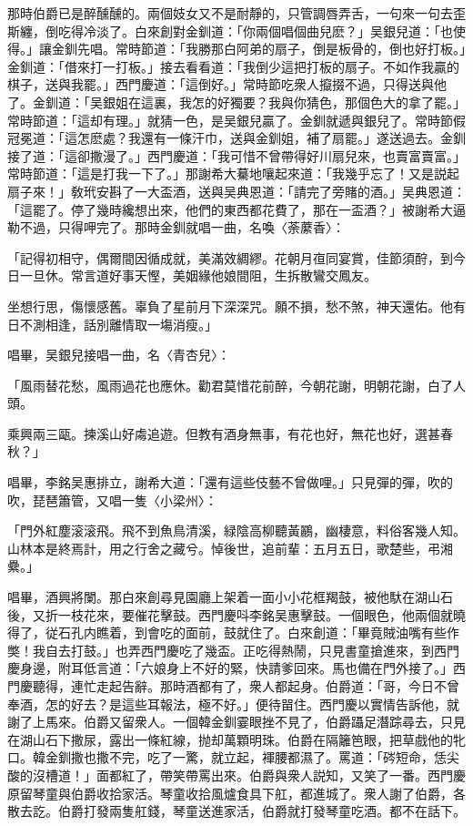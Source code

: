 那時伯爵已是醉醺醺的。兩個妓女又不是耐靜的，只管調唇弄舌，一句來一句去歪斯纏，倒吃得冷淡了。白來創對金釧道：「你兩個唱個曲兒麽？」吴銀兒道：「也使得。」讓金釧先唱。常時節道：「我勝那白阿弟的扇子，倒是板骨的，倒也好打板。」金釧道：「借來打一打板。」接去看看道：「我倒少這把打板的扇子。不如作我贏的棋子，送與我罷。」西門慶道：「這倒好。」常時節吃衆人攛掇不過，只得送與他了。金釧道：「吴銀姐在這裏，我怎的好獨要？我與你猜色，那個色大的拿了罷。」常時節道：「這却有理。」就猜一色，是吴銀兒贏了。金釧就遞與銀兒了。常時節假冠冕道：「這怎麽處？我還有一條汗巾，送與金釧姐，補了扇罷。」遂送過去。金釧接了道：「這卻撒漫了。」西門慶道：「我可惜不曾帶得好川扇兒來，也賣富賣富。」常時節道：「這是打我一下了。」那謝希大驀地嚷起來道：「我幾乎忘了！又是説起扇子來！」敎玳安斟了一大盃酒，送與吴典恩道：「請完了旁賭的酒。」吴典恩道：「這罷了。停了幾時纔想出來，他們的東西都花費了，那在一盃酒？」被謝希大逼勒不過，只得呷完了。那時金釧就唱一曲，名喚〈荼䕷香〉：

\begin{myquote}
「記得初相守，偶爾間因循成就，美滿效綢繆。花朝月亱同宴賞，佳節須酧，到今日一旦休。常言道好事天慳，美姻緣他娘間阻，生拆散鸞交鳳友。

坐想行思，傷懷感舊。辜負了星前月下深深咒。願不損，愁不煞，神天還佑。他有日不測相逢，話別離情取一塲消瘦。」
\end{myquote}

唱畢，吴銀兒接唱一曲，名〈青杏兒〉：

\begin{myquote}
「風雨替花愁，風雨過花也應休。勸君莫惜花前醉，今朝花謝，明朝花謝，白了人頭。

乘興兩三甌。揀溪山好䖏追遊。但教有酒身無事，有花也好，無花也好，選甚春秋？」
\end{myquote}

唱畢，李銘吴惠排立，謝希大道：「還有這些伎藝不曾做哩。」只見彈的彈，吹的吹，琵琶簫管，又唱一隻〈小梁州〉：

\begin{myquote}
「門外紅塵滚滚飛。飛不到魚鳥清溪，緑陰高柳聽黃鸝，幽棲意，料俗客幾人知。山林本是終焉計，用之行舍之藏兮。悼後世，追前輩：五月五日，歌楚些，弔湘纍。」
\end{myquote}

唱畢，酒興將闌。那白來創尋見園廳上架着一面小小花框羯鼓，被他馱在湖山石後，又折一枝花來，要催花擊鼓。西門慶呌李銘吴惠擊鼓。一個眼色，他兩個就曉得了，従石孔内瞧着，到會吃的面前，鼓就住了。白來創道：「畢竟賊油嘴有些作獘！我自去打鼓。」也弄西門慶吃了幾盃。正吃得熱鬧，只見書童搶進來，到西門慶身邊，附耳低言道：「六娘身上不好的緊，快請爹回來。馬也備在門外接了。」西門慶聽得，連忙走起告辭。那時酒都有了，衆人都起身。伯爵道：「哥，今日不曾奉酒，怎的好去？是這些耳報法，極不好。」便待㽞住。西門慶以實情告訴他，就謝了上馬來。伯爵又留衆人。一個韓金釧霎眼挫不見了，伯爵躡足潛踪尋去，只見在湖山石下撒尿，露出一條紅線，抛却萬顆明珠。伯爵在隔籬笆眼，把草戲他的牝口。韓金釧撒也撒不完，吃了一驚，就立起，褌腰都濕了。罵道：「硶短命，恁尖酸的沒槽道！」面都紅了，帶笑帶罵出來。伯爵與衆人説知，又笑了一番。西門慶原留琴童與伯爵收拾家活。琴童收拾風爐食具下舡，都進城了。衆人謝了伯爵，各散去訖。伯爵打發兩隻舡錢，琴童送進家活，伯爵就打發琴童吃酒。都不在話下。

